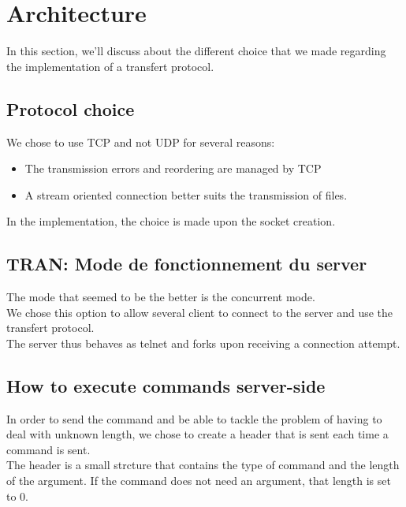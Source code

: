 \documentclass{article}
\begin{document}
\newpage


\section{Architecture}
In this section, we'll discuss about the different choice that we made regarding the implementation of a transfert protocol.

\subsection{Protocol choice}
We chose to use TCP and not UDP for several reasons:
\begin{itemize}
  \item The transmission errors and reordering are managed by TCP
  \item A stream oriented connection better suits the transmission of files.
\end{itemize}
In the implementation, the choice is made upon the socket creation.

\subsection{TRAN: Mode de fonctionnement du server}
The mode that seemed to be the better is the concurrent mode. \\
We chose this option to allow several client to connect to the server and use the transfert protocol.\\
The server thus behaves as telnet and forks upon receiving a connection attempt.

\subsection{How to execute commands server-side}
In order to send the command and be able to tackle the problem of having to deal with unknown length, we chose to create a header that is sent each time a command is sent.\\
The header is a small strcture that contains the type of command and the length of the argument. If the command does not need an argument, that length is set to $0$.\\
\end{document}
